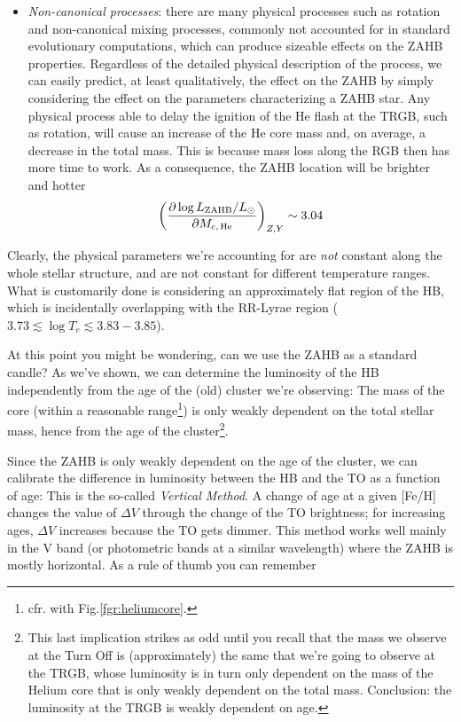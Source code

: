\begin{itemize}
\begin{equation*}
            \left(\parder{\log L_{\text{ZAHB}}/L_{\odot}}{Z}\right)_{M_{c}, Y} \sim -0.04
        \end{equation*}
    \item \emph{Non-canonical processes}: there are many physical processes such as rotation and non-canonical mixing processes, commonly not accounted for in standard evolutionary computations, which can produce sizeable effects on the ZAHB properties. Regardless of the detailed physical description of the process, we can easily predict, at least qualitatively, the effect on the ZAHB by simply considering the effect on the parameters characterizing a ZAHB star. Any physical process able to delay the ignition of the He flash at the TRGB, such as rotation, will cause an increase of the He core mass and, on average, a decrease in the total mass. This is because mass loss along the RGB then has more time to work. As a consequence, the ZAHB location will be brighter and hotter
        \begin{equation*}
            \left(\frac{\partial \log L_{\text{ZAHB}}/L_{\odot}}{\partial M_{c,\,\text{He}}}\right)_{Z, Y} \sim 3.04
        \end{equation*}
\end{itemize}
Clearly, the physical parameters we're accounting for are \emph{not} constant along the whole stellar structure, and are not constant for different temperature ranges. What is customarily done is considering an approximately flat region of the HB, which is incidentally overlapping with the RR-Lyrae region ($3.73 \lesssim \log T_{e} \lesssim 3.83-3.85$).
\par At this point you might be wondering, can we use the ZAHB as a standard candle? As we've shown, we can determine the luminosity of the HB independently from the age of the (old) cluster we're observing: The mass of the core (within a reasonable range\footnote{cfr. with Fig.\ref{fgr:heliumcore}.}) is only weakly dependent on the total stellar mass, hence from the age of the cluster\footnote{This last implication strikes as odd until you recall that the mass we observe at the Turn Off is (approximately) the same that we're going to observe at the TRGB, whose luminosity is in turn only dependent on the mass of the Helium core that is only weakly dependent on the total mass. Conclusion: the luminosity at the TRGB is weakly dependent on age.}.
\par Since the ZAHB is only weakly dependent on the age of the cluster, we can calibrate the difference in luminosity between the HB and the TO as a function of age: This is the so-called \emph{Vertical Method}. A change of age at a given [Fe/H] changes the value of $\Delta V$ through the change of the TO brightness; for increasing ages, $\Delta V$ increases because the TO gets dimmer. This method works well mainly in the V band (or photometric bands at a similar wavelength) where the ZAHB is mostly horizontal. As a rule of thumb you can remember
